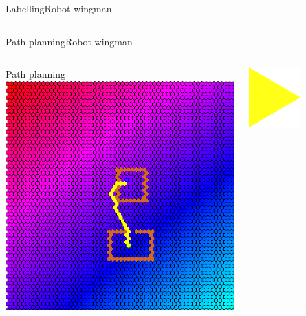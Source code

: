 \begin{frame}{Labelling}{Robot wingman}
\begin{columns}

\end{columns}

\end{frame}

\begin{frame}{Path planning}{Robot wingman}

\begin{columns}

\begin{minipage}{\textwidth}
\begin{block}{Path planning}
\centering
\includegraphics[width = \textwidth]{./figure/simulation/hexamap.png}
\end{block}
\end{minipage}

\begin{minipage}{\textwidth}
\centering
\includegraphics[width = 0.5\textwidth]{./figure/arrow2}
\end{minipage}


\end{columns}
\end{frame}
